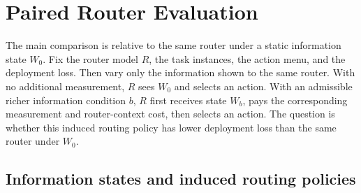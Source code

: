 \documentclass{article}
\begin{document}
\section{Paired Router Evaluation}
\label{sec:accounting}

The main comparison is relative to the same router under a static information state $W_0$.
Fix the router model $R$, the task instances, the action menu, and the deployment loss.
Then vary only the information shown to the same router.
With no additional measurement, $R$ sees $W_0$ and selects an action.
With an admissible richer information condition $b$, $R$ first receives state $W_b$, pays the corresponding measurement and router-context cost, then selects an action.
The question is whether this induced routing policy has lower deployment loss than the same router under $W_0$.

\subsection{Information states and induced routing policies}
\end{document}
